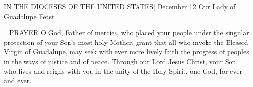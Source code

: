 IN THE DIOCESES OF THE UNITED STATES]
December 12
Our Lady of Guadalupe
Feast

\hangindent=\parindent \small{PRAYER 
O God, Father of mercies,
who placed your people under the singular protection
of your Son's most holy Mother,
grant that all who invoke the Blessed Virgin of Guadalupe,
may seek with ever more lively faith the progress of peoples in the ways of justice and of peace.
Through our Lord Jesus Christ, your Son,
who lives and reigns with you in the unity of the Holy Spirit,
one God, for ever and ever.\\}
 
